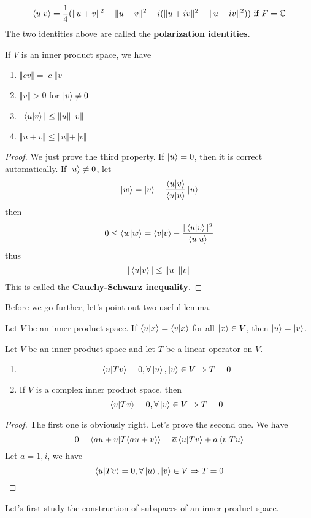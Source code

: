\documentclass{article}
\begin{document}
\[\braket{u|v}=\frac{1}{4}(\Vert u+v\Vert^2-\Vert u-v\Vert^2-i(\Vert u+iv\Vert^2-\Vert u-iv\Vert^2))\text{ if }F=\mathbb{C}\]
The two identities above are called the \textbf{polarization identities}.
\begin{thm}
	If $V$ is an inner product space, we have
	\begin{enumerate}
		\item $\Vert cv\Vert=|c|\Vert v\Vert$
		\item $\Vert v\Vert>0$ for $\ket{v}\neq0$
		\item $|\braket{u|v}|\le\Vert u\Vert\Vert v\Vert$
		\item $\Vert u+v\Vert\le \Vert u\Vert+\Vert v\Vert$
	\end{enumerate}
\end{thm}
\begin{proof}
	We just prove the third property. If $\ket{u}=0$, then it is correct automatically. If $\ket{u}\neq0$, let
	\[\ket{w}=\ket{v}-\frac{\braket{u|v}}{\braket{u|u}}\ket{u}\]
	then
	\[0\le\braket{w|w}=\braket{v|v}-\frac{|\braket{u|v}|^2}{\braket{u|u}}\]
	thus
	\[|\braket{u|v}|\le\Vert u\Vert\Vert v\Vert\]
	This is called the \textbf{Cauchy-Schwarz inequality}.
\end{proof}
Before we go further, let's point out two useful lemma.
\begin{lem}
	Let $V$ be an inner product space. If $\braket{u|x}=\braket{v|x}$ for all $\ket{x}\in V$, then $\ket{u}=\ket{v}$.
\end{lem}
\begin{lem}
	Let $V$ be an inner product space and let $T$ be a linear operator on $V$.
	\begin{enumerate}
		\item 
		\[\braket{u|Tv}=0,\forall \ket{u},\ket{v}\in V\Rightarrow T=0\]
		\item If $V$ is a complex inner product space, then
		\[\braket{v|Tv}=0,\forall \ket{v}\in V\Rightarrow T=0\]
	\end{enumerate}
\end{lem}
\begin{proof}
	The first one is obviously right. Let's prove the second one. We have
	\[0=\braket{au+v|T(au+v)}=\overline{a}\braket{u|Tv}+a\braket{v|Tu}\]
	Let $a=1,i$, we have
	\[\braket{u|Tv}=0,\forall \ket{u},\ket{v}\in V\Rightarrow T=0\]
\end{proof}
Let's first study the construction of subspaces of an inner product space.
\end{document}
